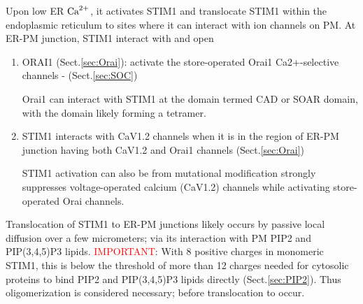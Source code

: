 Upon low ER ${\text{Ca}^{2+}}$, it activates STIM1 and translocate STIM1 within the
endoplasmic reticulum to sites where it can interact with ion channels on PM.
At ER-PM junction, STIM1 interact with and open
\begin{enumerate}
  
  \item ORAI1 (Sect.\ref{sec:Orai}): activate the store-operated Orai1
  Ca2+-selective channels - (Sect.\ref{sec:SOC})
  

Orai1 can interact with STIM1 at the domain termed CAD  or SOAR domain, with the
domain likely forming a tetramer.
  
  
  \item STIM1 interacts with CaV1.2 channels when it is in the region of ER-PM
 junction having both CaV1.2 and Orai1 channels (Sect.\ref{sec:Orai})
 
 STIM1  activation can also be from mutational modification strongly suppresses
 voltage-operated calcium (CaV1.2) channels while activating store-operated Orai
 channels. 
  
\end{enumerate}


Translocation of STIM1 to ER-PM junctions likely occurs by passive local
diffusion over a few micrometers; via its interaction with PM PIP2 and
PIP(3,4,5)P3 lipids. \textcolor{red}{IMPORTANT}:
With 8 positive charges in monomeric STIM1, this is below the threshold of more
than 12 charges needed for cytosolic proteins to bind PIP2 and PIP(3,4,5)P3
lipids directly (Sect.\ref{sec:PIP2}). Thus oligomerization is considered
necessary; before translocation to occur.



